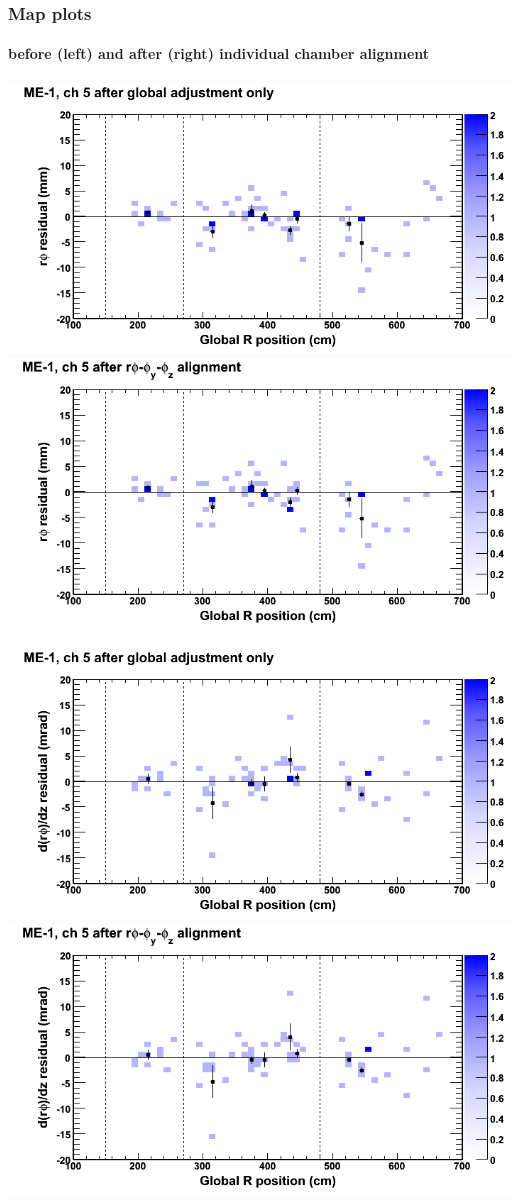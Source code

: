\documentclass[compress]{beamer}
\begin{document}
\begin{frame}
\frametitle{Map plots}
\framesubtitle{before (left) and after (right) individual chamber alignment}
\includegraphics[width=0.5\linewidth]{ringmapplots_3dof/before_CSCvsr_mem1ch05_x.png} \includegraphics[width=0.5\linewidth]{ringmapplots_3dof/after_CSCvsr_mem1ch05_x.png}

\includegraphics[width=0.5\linewidth]{ringmapplots_3dof/before_CSCvsr_mem1ch05_dxdz.png} \includegraphics[width=0.5\linewidth]{ringmapplots_3dof/after_CSCvsr_mem1ch05_dxdz.png}
\end{frame}
\end{document}
